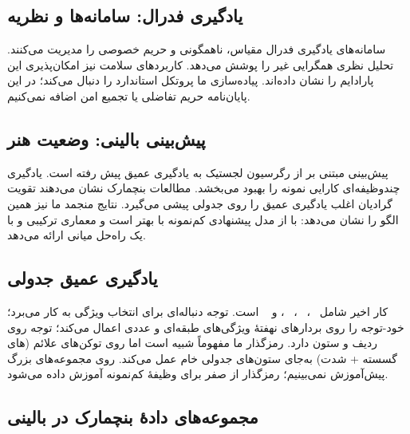 \subsection{یادگیری فدرال: سامانه‌ها و نظریه}

سامانه‌های یادگیری فدرال \cite{bonawitz2019towards,he2020fedml} مقیاس، ناهمگونی و حریم خصوصی را مدیریت می‌کنند. تحلیل نظری \cite{karimireddy2020scaffold,reddi2020fedopt} همگرایی غیر  را پوشش می‌دهد. کاربردهای سلامت \cite{rieke2020future,kaissis2021secure,zhang2021federated} نیز امکان‌پذیری این پارادایم را نشان داده‌اند. پیاده‌سازی  ما پروتکل استاندارد \cite{mcmahan2017communication} را دنبال می‌کند؛ در این پایان‌نامه حریم تفاضلی یا تجمیع امن اضافه نمی‌کنیم.

\subsection{پیش‌بینی بالینی: وضعیت هنر}

پیش‌بینی مبتنی بر  از رگرسیون لجستیک \cite{awad2017random} به یادگیری عمیق \cite{rajkomar2019scalable,choi2016doctor,pham2016deepcare} پیش رفته است. یادگیری چندوظیفه‌ای \cite{harutyunyan2019multitask} کارایی نمونه را بهبود می‌بخشد. مطالعات بنچمارک \cite{purushotham2018benchmarking} نشان می‌دهند تقویت گرادیان اغلب یادگیری عمیق را روی  جدولی پیشی می‌گیرد. نتایج منجمد ما نیز همین الگو را نشان می‌دهد:  با   از مدل پیشنهادی کم‌نمونه با  بهتر است و معماری ترکیبی  و  با  یک راه‌حل میانی ارائه می‌دهد.

\subsection{یادگیری عمیق جدولی}

کار اخیر شامل ~\cite{arik2021tabnet}، ~\cite{huang2020tabtransformer}، ~\cite{somepalli2021saint}، و ~\cite{gorishniy2024revisiting} است.  توجه دنباله‌ای برای انتخاب ویژگی به کار می‌برد؛  خود-توجه را روی بردارهای نهفتۀ ویژگی‌های طبقه‌ای و عددی اعمال می‌کند؛  توجه روی ردیف و ستون دارد. رمزگذار  ما مفهوماً شبیه  است اما روی توکن‌های علائم (های گسسته + شدت) به‌جای ستون‌های جدولی خام عمل می‌کند. روی مجموعه‌های بزرگ پیش‌آموزش نمی‌بینیم؛ رمزگذار از صفر برای وظیفۀ کم‌نمونه آموزش داده می‌شود.

\subsection{مجموعه‌های دادۀ بنچمارک در  بالینی}

